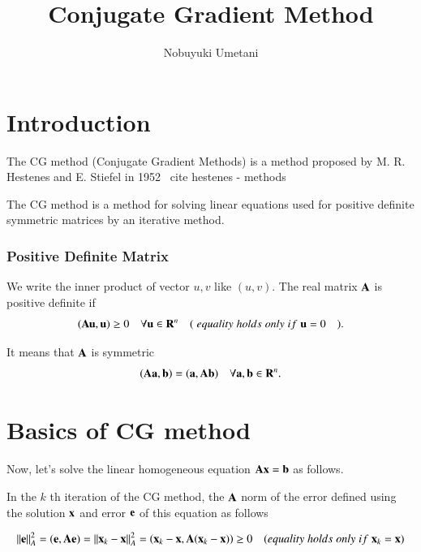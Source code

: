 



\title{Conjugate Gradient Method}
\author{Nobuyuki Umetani}

\maketitle
\tableofcontents


\section{Introduction}

The CG method (Conjugate Gradient Methods) is a method proposed by M. R. Hestenes and E. Stiefel in 1952 \ cite {hestenes - methods}

The CG method is a method for solving linear equations used for positive definite symmetric matrices by an iterative method.


\subsubsection{Positive Definite Matrix}


We write the inner product of vector $u,v$ like $(u,v)$.
%
The real matrix $\mathbf{A}$ is positive definite if 
%
\begin{equation}
(\mathbf{A}\mathbf{u},\mathbf{u})\ge0 \quad \forall\mathbf{u}\in\mathbf{R}^n \quad (\;equality\;holds\;only\;if\;\mathbf{u}=0 \quad ).
\end{equation}


It means that $\mathbf{A}$ is symmetric
%
\begin{equation}
(\mathbf{A}\mathbf{a},\mathbf{b})=(\mathbf{a},\mathbf{A}\mathbf{b}) \quad \forall\mathbf{a},\mathbf{b}\in\mathbf{R}^n.
\end{equation}
%


\section{Basics of CG method}


Now, let's solve the linear homogeneous equation $\mathbf{A}\mathbf{x}=\mathbf{b}$ as follows.

In the $k$ th iteration of the CG method, the $\mathbf{A}$ norm of the error defined using the solution $\mathbf{x	}$ and error $\mathbf{e}$ of this equation as follows

\begin{equation}
||\mathbf{e}||_A^2=(\mathbf{e},\mathbf{A}\mathbf{e})=||\mathbf{x}_k-\mathbf{x}||_A^2=\left(\mathbf{x}_k-\mathbf{x},\mathbf{A}(\mathbf{x}_k-\mathbf{x})\right)\ge0\quad(equality\;holds\;only\;if\;\mathbf{x}_k=\mathbf{x})
\end{equation}

